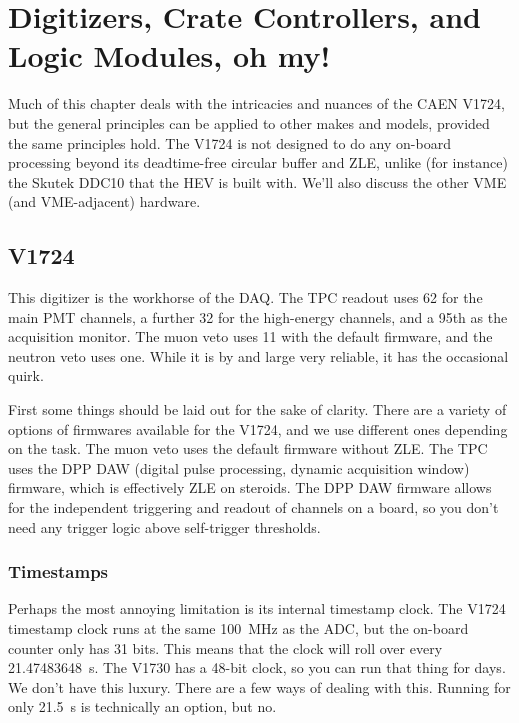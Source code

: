 \chapter{Digitizers, Crate Controllers, and Logic Modules, oh my!}\label{ch:hardware}

Much of this chapter deals with the intricacies and nuances of the CAEN V1724, but the general principles can be applied to other makes and models, provided the same principles hold.
The V1724 is not designed to do any on-board processing beyond its deadtime-free circular buffer and ZLE, unlike (for instance) the Skutek DDC10 that the HEV is built with.
We'll also discuss the other VME (and VME-adjacent) hardware.

\section{V1724}\label{sec:v1724}

This digitizer is the workhorse of the DAQ.
The TPC readout uses 62 for the main PMT channels, a further 32 for the high-energy channels, and a 95th as the acquisition monitor.
The muon veto uses 11 with the default firmware, and the neutron veto uses one.
While it is by and large very reliable, it has the occasional quirk.

First some things should be laid out for the sake of clarity.
There are a variety of options of firmwares available for the V1724, and we use different ones depending on the task.
The muon veto uses the default firmware without ZLE.
The TPC uses the DPP DAW (digital pulse processing, dynamic acquisition window) firmware, which is effectively ZLE on steroids.
The DPP DAW firmware allows for the independent triggering and readout of channels on a board, so you don't need any trigger logic above self-trigger thresholds.

\subsection{Timestamps}

Perhaps the most annoying limitation is its internal timestamp clock.
The V1724 timestamp clock runs at the same \SI{100}{\mega\hertz} as the ADC, but the on-board counter only has 31 bits.
This means that the clock will roll over every \SI{21.47483648}{\second}.
The V1730 has a 48-bit clock, so you can run that thing for days.
We don't have this luxury.
There are a few ways of dealing with this.
Running for only \SI{21.5}{\second} is technically an option, but no.

